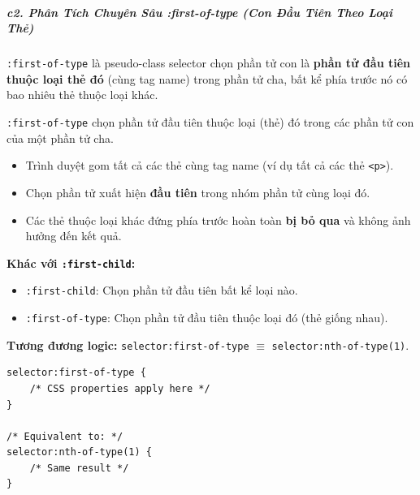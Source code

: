 \documentclass[11pt,oneside]{book}
\newcommand{\codeinline}[1]{\textcolor{accentOrange}{\texttt{#1}}}
\begin{document}

\subparagraph{c2. Phân Tích Chuyên Sâu :first-of-type (Con Đầu Tiên Theo Loại Thẻ)}

\codeinline{:first-of-type} là pseudo-class selector chọn phần tử con là \textbf{phần tử đầu tiên thuộc loại thẻ đó} (cùng tag name) trong phần tử cha, bất kể phía trước nó có bao nhiêu thẻ thuộc loại khác.

\begin{conceptBox}
\codeinline{:first-of-type} chọn phần tử đầu tiên thuộc loại (thẻ) đó trong các phần tử con của một phần tử cha.
\begin{itemize}[leftmargin=1.5em, itemsep=2pt, parsep=0pt]
    \item Trình duyệt gom tất cả các thẻ cùng tag name (ví dụ tất cả các thẻ \codeinline{<p>}).
    \item Chọn phần tử xuất hiện \textbf{đầu tiên} trong nhóm phần tử cùng loại đó.
    \item Các thẻ thuộc loại khác đứng phía trước hoàn toàn \textbf{bị bỏ qua} và không ảnh hưởng đến kết quả.
\end{itemize}
\par\vspace{4pt}
\textbf{Khác với \codeinline{:first-child}:}
\begin{itemize}[leftmargin=1.5em, itemsep=2pt, parsep=0pt]
    \item \codeinline{:first-child}: Chọn phần tử đầu tiên bất kể loại nào.
    \item \codeinline{:first-of-type}: Chọn phần tử đầu tiên thuộc loại đó (thẻ giống nhau).
\end{itemize}
\par\vspace{4pt}
\textbf{Tương đương logic:} \codeinline{selector:first-of-type} $\equiv$ \codeinline{selector:nth-of-type(1)}.
\end{conceptBox}

\begin{codeWindow}
\begin{lstlisting}[language=CSS3]
selector:first-of-type {
    /* CSS properties apply here */
}

/* Equivalent to: */
selector:nth-of-type(1) {
    /* Same result */
}
\end{lstlisting}
\end{codeWindow}
\end{document}
